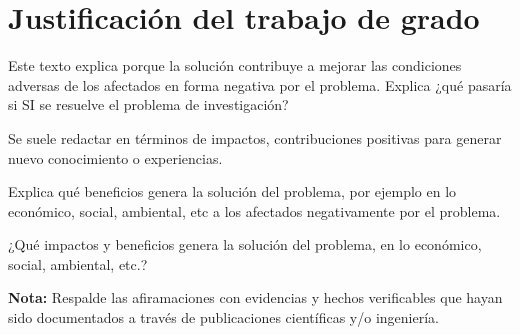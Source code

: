 \section{Justificación del trabajo de grado}
Este texto explica porque la solución contribuye a mejorar las condiciones adversas de los afectados en forma negativa por el problema. Explica ¿qué pasaría si SI se resuelve el problema de investigación?

Se suele redactar en términos de impactos, contribuciones positivas para generar nuevo conocimiento o experiencias. 

Explica qué beneficios genera la solución del problema, por ejemplo en lo económico, social, ambiental, etc a los afectados negativamente por el problema.

¿Qué impactos y beneficios genera la solución del problema, en lo económico, social, ambiental, etc.? 

\textbf{Nota:} Respalde las afiramaciones con evidencias y hechos verificables que hayan sido documentados a través de publicaciones científicas y/o ingeniería. 
